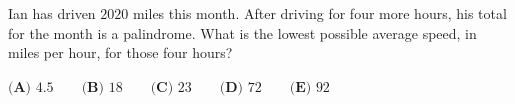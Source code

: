 Ian has driven $2020$ miles this month. After driving for four more hours, his total for the month is a palindrome. What is the lowest possible average speed, in miles per hour, for those four hours?

$\textbf{(A) }4.5\qquad\textbf{(B) }18\qquad\textbf{(C) }23\qquad\textbf{(D) }72\qquad\textbf{(E) }92$

